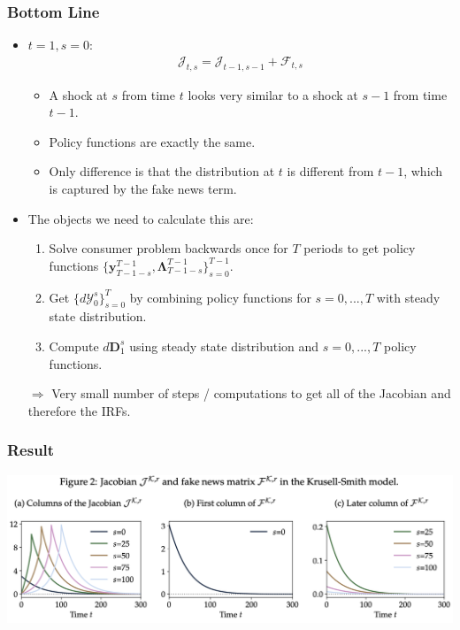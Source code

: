 \documentclass[english,xcolor=svgnames]{beamer}
\begin{document}
\begin{frame}
    \frametitle{Bottom Line}
    \begin{itemize}
        \item $t=1,s=0$:
        \begin{align*}
        	\mathcal{J}_{t,s} = \mathcal{J}_{t-1,s-1} + \mathcal{F}_{t,s} 
        \end{align*}
        \begin{itemize}
        	\item A shock at $s$ from time $t$ looks very similar to a shock at $s-1$ from time $t-1$. 
        	\item Policy functions are exactly the same.
        	\item Only difference is that the distribution at $t$ is different from $t-1$, which is captured by the fake news term. 
        \end{itemize}
       	\item The objects we need to calculate this are:
       	\begin{enumerate}
       		\item Solve consumer problem backwards once for $T$ periods to get policy functions $\{\bm{y}^{T-1}_{T-1-s},\bm{\Lambda}^{T-1}_{T-1-s}\}_{s=0}^{T-1}$.
       		\item Get $\{d\mathcal{Y}_0^s\}_{s=0}^T$ by combining policy functions for $s=0,...,T$ with steady state distribution.
       		\item Compute $d\bm{D}_1^s$ using steady state distribution and $s=0,...,T$ policy functions.
       	\end{enumerate}
       	\item[$\Rightarrow$] Very small number of steps / computations to get all of the Jacobian and therefore the IRFs.
	\end{itemize}
\end{frame}


\begin{frame}
    \frametitle{Result}
    \centering
    \includegraphics[scale=0.5]{figures/ABRSFIG2.png}
\end{frame}
\end{document}

